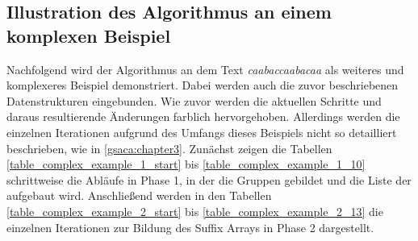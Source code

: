 \newpage
\subsection{Illustration des Algorithmus an einem komplexen Beispiel}
\label{gsaca:chapter6}

Nachfolgend wird der Algorithmus an dem Text \textit{caabaccaabacaa} als weiteres und komplexeres Beispiel demonstriert. 
Dabei werden auch die zuvor beschriebenen Datenstrukturen eingebunden. 
Wie zuvor werden die aktuellen Schritte und daraus resultierende Änderungen farblich hervorgehoben.
Allerdings werden die einzelnen Iterationen aufgrund des Umfangs dieses Beispiels nicht so detailliert beschrieben, wie in \ref{gsaca:chapter3}.
Zunächst zeigen die Tabellen \ref{table_complex_example_1_start} bis \ref{table_complex_example_1_10} schritt\-weise die Abläufe in Phase 1, in der die Gruppen gebildet und die Liste der \prevpointer aufgebaut wird. 
Anschließend werden in den Tabellen \ref{table_complex_example_2_start} bis \ref{table_complex_example_2_13} die einzelnen Iterationen zur Bildung des Suffix Arrays in Phase 2 dargestellt.


